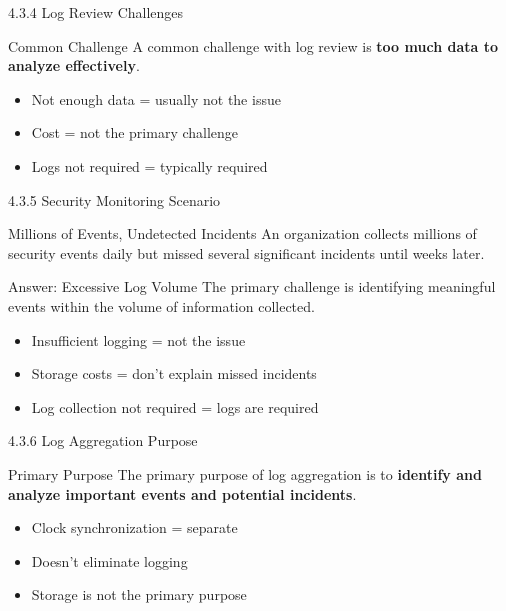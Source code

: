 \documentclass{beamer}
\begin{document}
	\begin{frame}{4.3.4 Log Review Challenges}
		\begin{block}{Common Challenge}
			A common challenge with log review is \textbf{too much data to analyze effectively}.
		\end{block}
		\begin{itemize}
			\item Not enough data = usually not the issue
			\item Cost = not the primary challenge
			\item Logs not required = typically required
		\end{itemize}
	\end{frame}
	
	\begin{frame}{4.3.5 Security Monitoring Scenario}
		\begin{block}{Millions of Events, Undetected Incidents}
			An organization collects millions of security events daily but missed several significant incidents until weeks later.
		\end{block}
		\begin{exampleblock}{Answer: Excessive Log Volume}
			The primary challenge is identifying meaningful events within the volume of information collected.
		\end{exampleblock}
		\begin{itemize}
			\item Insufficient logging = not the issue
			\item Storage costs = don't explain missed incidents
			\item Log collection not required = logs are required
		\end{itemize}
	\end{frame}
	
	\begin{frame}{4.3.6 Log Aggregation Purpose}
		\begin{block}{Primary Purpose}
			The primary purpose of log aggregation is to \textbf{identify and analyze important events and potential incidents}.
		\end{block}
		\begin{itemize}
			\item Clock synchronization = separate
			\item Doesn't eliminate logging
			\item Storage is not the primary purpose
		\end{itemize}
	\end{frame}
	
\end{document}
